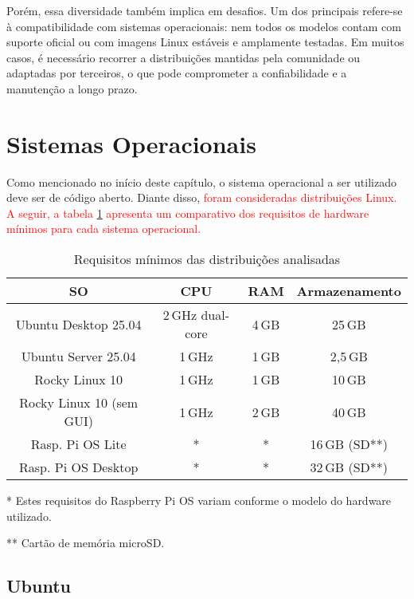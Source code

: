 Porém, essa diversidade também implica em desafios. Um dos principais refere-se à compatibilidade com sistemas operacionais: nem todos os modelos contam com suporte oficial ou com imagens Linux estáveis e amplamente testadas. Em muitos casos, é necessário recorrer a distribuições mantidas pela comunidade ou adaptadas por terceiros, o que pode comprometer a confiabilidade e a manutenção a longo prazo.


\section{Sistemas Operacionais}
\label{section:SistemasOperacionais}

Como mencionado no início deste capítulo, o sistema operacional a ser utilizado deve ser de código aberto. Diante disso, \textcolor{red}{
    foram consideradas distribuições Linux. A seguir, a tabela \ref{tab:requisitos-minimos} apresenta um comparativo dos requisitos de hardware mínimos para cada sistema operacional.
}
\begin{table}[H]
\centering
\caption{Requisitos mínimos das distribuições analisadas}
\label{tab:requisitos-minimos}
\begin{tabular}{@{}c c c c@{}}
\toprule
\textbf{SO} & \textbf{CPU} & \textbf{RAM} & \textbf{Armazenamento} \\
\midrule
Ubuntu Desktop 25.04 & 2\,GHz dual-core & 4\,GB & 25\,GB \\
Ubuntu Server 25.04 & 1\,GHz & 1\,GB & 2{,}5\,GB \\
Rocky Linux 10 & 1\,GHz & 1\,GB & 10\,GB \\
Rocky Linux 10 (sem GUI) & 1\,GHz & 2\,GB & 40\,GB \\
Rasp. Pi OS Lite & * & * & 16\,GB (SD**) \\
Rasp. Pi OS Desktop & * & * & 32\,GB (SD**) \\
\bottomrule
\end{tabular}
\begin{flushleft}
\footnotesize

* Estes requisitos do Raspberry Pi OS variam conforme o modelo do hardware utilizado.

** Cartão de memória microSD.
\end{flushleft}
\end{table}

\subsection{Ubuntu}
\label{subsection:Ubuntu}

